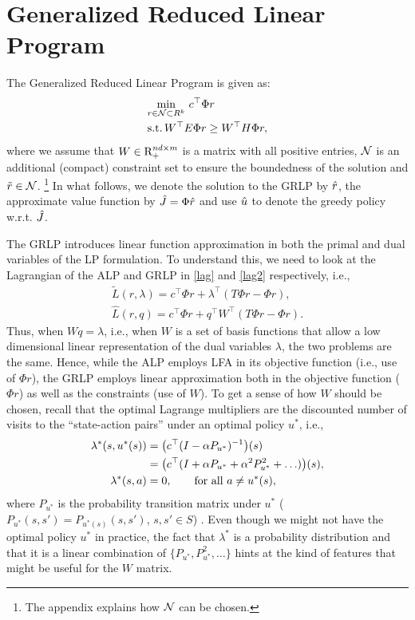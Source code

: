 \section{Generalized Reduced Linear Program}
The Generalized Reduced Linear Program is given as:
\begin{align}\label{grlp}
\begin{split}
&\underset{r\in \N\subset R^k}{\min}\, \, c^\top \Phi r\,\,\,\,\\
&\text{s.t.}\mb  \,W^\top E\Phi r\geq W^\top H \Phi r,
\end{split}
\end{align}
where we assume that $W \in \mathrm{R}^{nd\times m}_+$ is a matrix with all positive entries, $\mathcal{N}$ is an additional (compact) constraint set to ensure the boundedness of the solution and $\tilde{r} \in \mathcal{N}$.
\footnote{The appendix explains how $\mathcal{N}$ can be chosen.}
In what follows, we denote the solution to the GRLP by $\hat{r}$, the approximate value function by $\hat{J}=\Phi \hat{r}$ and use $\hat{u}$ to denote the greedy policy w.r.t. $\hat{J}$.\par
The GRLP introduces linear function approximation in both the primal and dual variables of the LP formulation. 
To understand this, we need to look at the Lagrangian of the ALP and GRLP in 
\eqref{lag} and \eqref{lag2} respectively, i.e., 
\begin{align}\label{lag}
\tilde{L}(r,\lambda)=c^\top \Phi r+\lambda^\top (T\Phi r-\Phi r), \\ \label{lag2}\hat{L}(r,q)=c^\top \Phi r+q^\top W^\top (T\Phi r-\Phi r).
\end{align}
Thus, when $Wq = \lambda$, i.e., when $W$ is a set of basis functions that allow
a low dimensional linear representation of the dual variables $\lambda$,
the two problems are the same.
Hence, while the ALP employs LFA in its objective function (i.e., use of $\Phi r$), the GRLP employs linear approximation both in the objective function ($\Phi r$) as well as the constraints (use of $W$). 
To get a sense of how $W$ should be chosen, recall that
the optimal Lagrange multipliers are the discounted number of visits to the ``state-action pairs'' under an optimal policy $u^*$, i.e., 
\begin{align}
\lambda^*(s,u^*(s))&=\big(c^\top(I-\alpha P_{u^*})^{-1}\big)(s)\nonumber\\
				&= \big(c^\top(I+\alpha P_{u^*}+\alpha^2 P_{u^*}^2+\ldots)\big)(s),\nonumber\\
			\lambda^*(s,a)&=0, \qquad \text{for all } a \neq u^*(s),\nonumber
\end{align}
where $P_{u^*}$ is the probability transition matrix under $u^*$ ($P_{u^*}(s,s') = P_{u^*(s)}(s,s')$, $s,s'\in S$) \cite{dolgov}. Even though we might not have the optimal policy $u^*$ in practice, the fact that $\lambda^*$ is a probability distribution and that it is a linear combination of $\{P_{u^*},P^2_{u^*},\ldots\}$ hints at the kind of features that might be useful for the $W$ matrix.
